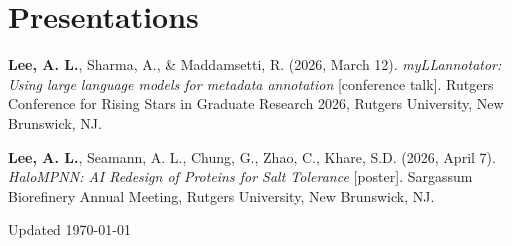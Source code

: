 \documentclass[11pt,letterpaper]{report} %
\begin{document}
    \section*{Presentations}

    \begin{tablist}
        \item[2026] \tab{}\textbf{Lee, A. L.}, Sharma, A., \& Maddamsetti, R. (2026, March 12). \textit{myLLannotator: Using large language models for metadata annotation} [conference talk]. Rutgers Conference for Rising Stars in Graduate Research 2026, Rutgers University, New Brunswick, NJ.
        \item[2026] \tab{}\textbf{Lee, A. L.}, Seamann, A. L., Chung, G., Zhao, C., Khare, S.D. (2026, April 7). \textit{HaloMPNN: AI Redesign of Proteins for Salt Tolerance} [poster]. Sargassum Biorefinery Annual Meeting, Rutgers University, New Brunswick, NJ.

    \end{tablist}


    \begin{center}
        \vfill
        Updated \monthyeardate\today
    \end{center}
\end{document}
